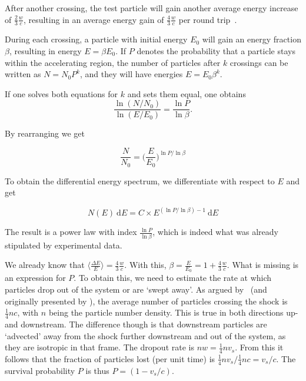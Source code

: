 After another crossing, the test particle will gain another average energy increase of $\frac{2}{3}\frac{w}{c}$, resulting in an average energy gain of $\frac{4}{3}\frac{w}{c}$ per round trip~\cite{Longair2011}.

During each crossing, a particle with initial energy $E_0$ will gain an energy fraction $\beta$, resulting in energy $E=\beta E_0$. If $P$ denotes the probability that a particle stays within the accelerating region, the number of particles after $k$ crossings can be written as $N=N_0 P^k $, and they will have energies $E=E_0\beta^k$.

If one solves both equations for $k$ and sets them equal, one obtains
\begin{equation}
    \frac{\ln (N/N_0)}{\ln (E/E_0)} = \frac{\ln P}{\ln \beta}.
\end{equation}

By rearranging we get

\begin{equation}
    \frac{N}{N_0} = \bigg(\frac{E}{E_0}\bigg)^{\ln P / \ln \beta}
\end{equation}

To obtain the differential energy spectrum, we differentiate with respect to $E$ and get

\begin{equation}
    \label{eqn:diff_e_spec}
    N(E)~\text{d} E = C\times E^{(\ln P/\ln\beta)-1}~\text{d} E
\end{equation}

The result is a power law with index $\frac{\ln P}{\ln \beta}$, which is indeed what was already stipulated by experimental data.

We already know that $\big\langle\frac{\Delta E}{E}\big\rangle = \frac{4}{3}\frac{w}{c}$. With this, $\beta = \frac{E}{E_0} = 1 + \frac{4}{3}\frac{w}{c}$. What is missing is an expression for $P$. To obtain this, we need to estimate the rate at which particles drop out of the system or are `swept away'. As argued by~\cite{Longair2011} (and originally presented by ), the average number of particles crossing the shock is $\frac{1}{4} n c$, with $n$ being the particle number density. This is true in both directions up- and downstream. The difference though is that downstream particles are `advected' away from the shock further downstream and out of the system, as they are isotropic in that frame. The dropout rate is $n w=\frac{1}{4}nv_s$. From this it follows that the fraction of particles lost (per unit time) is $\frac{1}{4} n v_s/\frac{1}{4}nc = v_s/c$. The survival probability $P$ is thus $P=(1-v_s/c)$.

